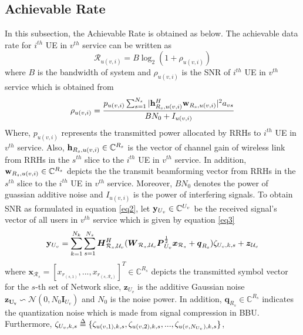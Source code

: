 \documentclass[conference]{IEEEtran}
\def\delequal{\mathrel{\ensurestackMath{\stackon[1pt]{=}{\scriptstyle\Delta}}}}
\begin{document}
\subsection{Achievable Rate}
In this subsection, the Achievable Rate is obtained as below.
The achievable data rate for $i^{th}$ UE in $v^{th}$ service can be written as 
\begin{equation}\label{eq1}
\mathcal{R}_{u(v,i)} = B \log_2({1+ \rho_{u(v,i)}})
\end{equation}
where $B$ is the bandwidth of system and $\rho_{u(v,i)}$ is the SNR of $i^{th}$ UE in $v^{th}$ service which is obtained from 
\begin{equation}\label{eq2}
\rho_{u(v,i)} =  \frac{p_{u(v,i)}\sum_{s=1}^{N_s}|\bold{h}_{R_s,u(v,i)}^H \bold{w}_{R_s,u(v,i)}|^2 a_{vs}}{BN_0 + I_{u(v,i)}}
\end{equation}
Where, $p_{u(v,i)}$ represents the transmitted power allocated by RRHs to $i^{th}$ UE in $v^{th}$ service. Also, 
$\bold{h}_{R_s,u(v,i)} \in \mathbb{C}^{{R}_s}$ is the vector of channel gain of wireless link from RRHs in the $s^{th}$ slice to the $i^{th}$ UE in $v^{th}$ service. In addition, $\bold{w}_{R_s,u(v,i)} \in \mathbb{C}^{{R}_s}$ depicts the the transmit beamforming vector from RRHs in the $s^{th}$ slice to the $i^{th}$ UE in $v^{th}$ service. Moreover, $BN_0$ denotes the power of guassian additive noise and $I_{u(v,i)}$ is the power of interfering signals. 
To obtain SNR as formulated in equation \eqref{eq2}, let $\bold{y}_{U_v}\in \mathbb{C}^{U_v} $ be the received signal's vector of all users in $v^{th}$ service which is given by equation \eqref{eq3}
\begin{equation}\label{eq3}
\bold{y}_{U_v} = \sum_{k=1}^{N_k}\sum_{s = 1}^{N_s} \boldsymbol{H}^H_{\mathcal{R}_s,\mathcal{U}_v}(\boldsymbol{W}_{\mathcal{R}_s,\mathcal{U}_v}\boldsymbol{P}_{U_v}^{\frac{1}{2}}\boldsymbol{x}_{\mathcal{R}_s}+ \boldsymbol{q}_{R_s}) \zeta_{U_v,k,s}+ \boldsymbol{z}_{\mathcal{U}_v}
\end{equation}
where $\boldsymbol{x}_{ \mathcal{R}_s} = [x_{ r_{(s,1)}},...,x_{ r_{(s,\mathcal{R}_s)}}]^T \in \mathbb{C}^{{R}_s } $ depicts the transmitted symbol vector for the $s$-th set of Network slice,  $\boldsymbol{z}_{U_v}$ is the additive Gaussian noise $\boldsymbol{z_{U_v}} \backsim \mathcal{N}(0,N_0\boldsymbol{I}_{{U}_v})$ and $N_0$ is the noise power.
In addition, $\boldsymbol{q}_{R_s} \in \mathbb{C}^{{R}_s }  $ indicates the quantization noise which is made from signal compression in BBU.
\\
Furthermore, $\zeta_{U_v,k,s} \delequal \{\zeta_{u(v,1),k,s},\zeta_{u(v,2),k,s},...,\zeta_{u(v,N_{U_v}),k,s}\}$,
\end{document}
